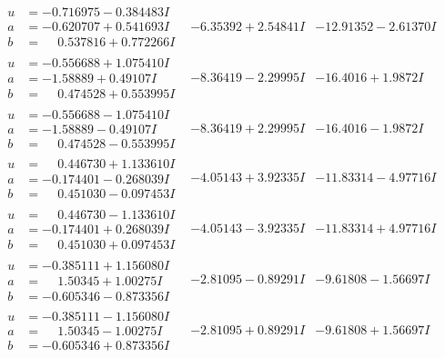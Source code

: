 \documentclass[1p]{elsarticle_modified}
\theoremstyle{definition}
\begin{document}
$$\begin{array}{c|c|c}
\begin{aligned}
u &= -0.716975 - 0.384483 I \\
a &= -0.620707 + 0.541693 I \\
b &= \phantom{-}0.537816 + 0.772266 I\end{aligned}
 & -6.35392 + 2.54841 I & -12.91352 - 2.61370 I \\ \hline\begin{aligned}
u &= -0.556688 + 1.075410 I \\
a &= -1.58889 + 0.49107 I \\
b &= \phantom{-}0.474528 + 0.553995 I\end{aligned}
 & -8.36419 - 2.29995 I & -16.4016 + 1.9872 I \\ \hline\begin{aligned}
u &= -0.556688 - 1.075410 I \\
a &= -1.58889 - 0.49107 I \\
b &= \phantom{-}0.474528 - 0.553995 I\end{aligned}
 & -8.36419 + 2.29995 I & -16.4016 - 1.9872 I \\ \hline\begin{aligned}
u &= \phantom{-}0.446730 + 1.133610 I \\
a &= -0.174401 - 0.268039 I \\
b &= \phantom{-}0.451030 - 0.097453 I\end{aligned}
 & -4.05143 + 3.92335 I & -11.83314 - 4.97716 I \\ \hline\begin{aligned}
u &= \phantom{-}0.446730 - 1.133610 I \\
a &= -0.174401 + 0.268039 I \\
b &= \phantom{-}0.451030 + 0.097453 I\end{aligned}
 & -4.05143 - 3.92335 I & -11.83314 + 4.97716 I \\ \hline\begin{aligned}
u &= -0.385111 + 1.156080 I \\
a &= \phantom{-}1.50345 + 1.00275 I \\
b &= -0.605346 - 0.873356 I\end{aligned}
 & -2.81095 - 0.89291 I & -9.61808 - 1.56697 I \\ \hline\begin{aligned}
u &= -0.385111 - 1.156080 I \\
a &= \phantom{-}1.50345 - 1.00275 I \\
b &= -0.605346 + 0.873356 I\end{aligned}
 & -2.81095 + 0.89291 I & -9.61808 + 1.56697 I \\ \hline\begin{aligned}

\end{aligned}
\end{array}$$
\end{document}
